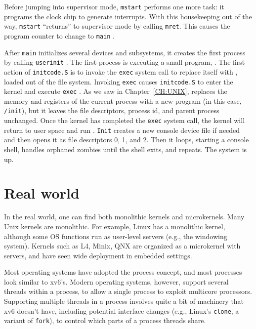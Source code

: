 Before jumping into supervisor mode,
\lstinline{mstart}
performs one more task: it programs the clock
chip to generate interrupts.
With this housekeeping out of the way,
\lstinline{mstart}
``returns'' to supervisor
mode by calling
\lstinline{mret}.
This causes the program counter to change
to
\lstinline{main}
.

After
\lstinline{main}
initializes several devices and subsystems, 
it creates the first process by calling 
\lstinline{userinit}
.
The first process is executing a small program,
.
The first action of 
\lstinline{initcode.S}
is to invoke  the
\lstinline{exec}
system call to replace itself with
,
loaded out of the file system.
Invoking
\lstinline{exec}
causes
\lstinline{initcode.S}
to enter the kernel and execute
\lstinline{exec}
.
As we saw in Chapter~\ref{CH:UNIX}, 
replaces the memory and registers of the
current process with a new program (in this case,
\lstinline{/init}),
but it leaves the
file descriptors, process id, and parent process unchanged.
Once the kernel has completed the
\lstinline{exec}
system call, the kernel will return to user space and run
.
\lstinline{Init}
creates a new console device file
if needed
and then opens it as file descriptors 0, 1, and 2.
Then it loops,
starting a console shell, 
handles orphaned zombies until the shell exits,
and repeats.
The system is up.
\section{Real world}

In the real world, one can find both monolithic kernels and microkernels. Many
Unix kernels are monolithic. For example, Linux has a monolithic kernel,
although some OS functions run as user-level servers (e.g., the windowing
system).  Kernels such as L4, Minix, QNX are organized as a microkernel with
servers, and have seen wide deployment in embedded settings.

Most operating systems have adopted the process concept, and most
processes look similar to xv6's.  Modern operating systems, however,
support several threads within a process, to allow a single process to
exploit multicore processors.  Supporting multiple threads in a
process involves quite a bit of machinery that xv6 doesn't have,
including potential interface changes (e.g., Linux's
\lstinline{clone},
a variant of
\lstinline{fork}),
to control which parts of
a process threads share.
